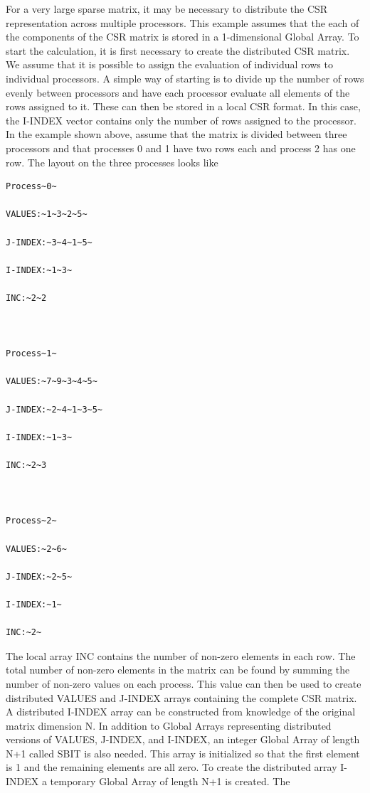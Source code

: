 For a very large sparse matrix, it may be necessary to distribute
the CSR representation across multiple processors. This example assumes
that the each of the components of the CSR matrix is stored in a 1-dimensional
Global Array. To start the calculation, it is first necessary to create
the distributed CSR matrix. We assume that it is possible to assign
the evaluation of individual rows to individual processors. A simple
way of starting is to divide up the number of rows evenly between
processors and have each processor evaluate all elements of the rows
assigned to it. These can then be stored in a local CSR format. In
this case, the I-INDEX vector contains only the number of rows assigned
to the processor. In the example shown above, assume that the matrix
is divided between three processors and that processes 0 and 1 have
two rows each and process 2 has one row. The layout on the three processes
looks like
\begin{verbatim}
Process~0~

VALUES:~1~3~2~5~

J-INDEX:~3~4~1~5~

I-INDEX:~1~3~

INC:~2~2



Process~1~

VALUES:~7~9~3~4~5~

J-INDEX:~2~4~1~3~5~

I-INDEX:~1~3~

INC:~2~3



Process~2~

VALUES:~2~6~

J-INDEX:~2~5~

I-INDEX:~1~

INC:~2~
\end{verbatim}
The local array INC contains the number of non-zero elements in each
row. The total number of non-zero elements in the matrix can be found
by summing the number of non-zero values on each process. This value
can then be used to create distributed VALUES and J-INDEX arrays containing
the complete CSR matrix. A distributed I-INDEX array can be constructed
from knowledge of the original matrix dimension N. In addition to
Global Arrays representing distributed versions of VALUES, J-INDEX,
and I-INDEX, an integer Global Array of length N+1 called SBIT is
also needed. This array is initialized so that the first element is
1 and the remaining elements are all zero. To create the distributed
array I-INDEX a temporary Global Array of length N+1 is created. The
